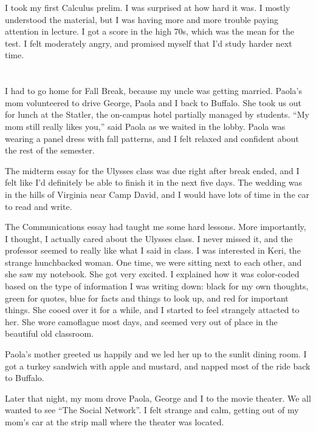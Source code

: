 I took my first Calculus prelim.  I was surprised at how hard it was.  I mostly
understood the material, but I was having more and more trouble paying attention
in lecture.  I got a score in the high 70s, which was the mean for the test.  I
felt moderately angry, and promised myself that I'd study harder next time.

\section{}

I had to go home for Fall Break, because my uncle was getting married.  Paola's
mom volunteered to drive George, Paola and I back to Buffalo.  She took us out
for lunch at the Statler, the on-campus hotel partially managed by students.
``My mom still really likes you,'' said Paola as we waited in the lobby.  Paola
was wearing a panel dress with fall patterns, and I felt relaxed and confident
about the rest of the semester.

The midterm essay for the Ulysses class was due right after break ended, and I
felt like I'd definitely be able to finish it in the next five days.  The
wedding was in the hills of Virginia near Camp David, and I would have lots of
time in the car to read and write.  

The Communications essay had taught me some hard lessons.  More importantly, I
thought, I actually cared about the Ulysses class.   I never missed it, and the
professor seemed to really like what I said in class.  I was interested in Keri,
the strange hunchbacked woman.  One time, we were sitting next to each other,
and she saw my notebook.  She got very excited.  I explained how it was
color-coded based on the type of information I was writing down: black for my
own thoughts, green for quotes, blue for facts and things to look up, and red
for important things.  She cooed over it for a while, and I started to feel
strangely attacted to her.  She wore camoflague most days, and seemed very out
of place in the beautiful old classroom.

Paola's mother greeted us happily and we led her up to the sunlit dining room.
I got a turkey sandwich with apple and mustard, and napped most of the ride back
to Buffalo.  

Later that night, my mom drove Paola, George and I to the movie theater.  We all
wanted to see ``The Social Network''.  I felt strange and calm, getting out of
my mom's car at the strip mall where the theater was located.


